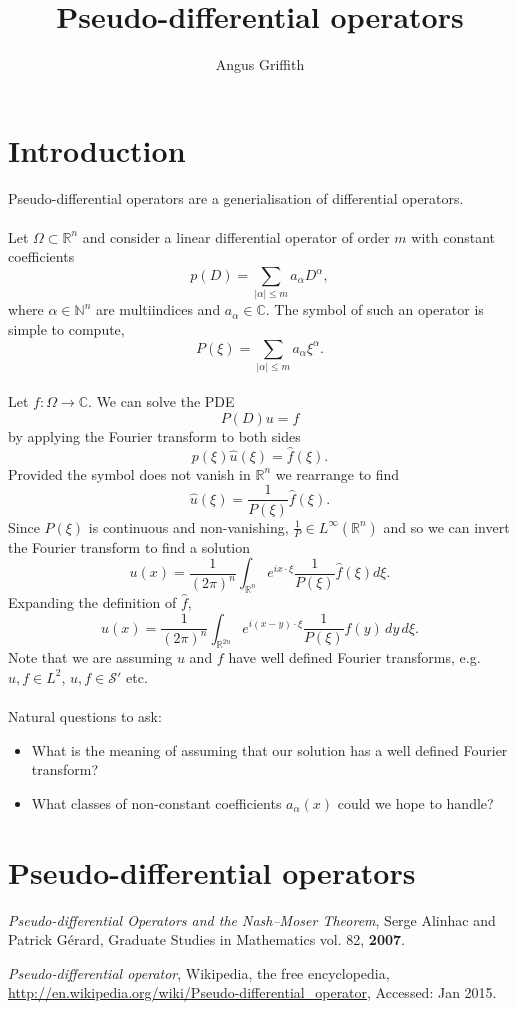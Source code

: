 \documentclass[10pt]{article}
\title{Pseudo-differential operators}
\author{Angus Griffith}
\newcommand{\R}{\mathbb{R}}
\newcommand{\C}{\mathbb{C}}
\newcommand{\N}{\mathbb{N}}
\begin{document}
\maketitle

\section{Introduction}
Pseudo-differential operators are a generialisation of differential operators.
\paragraph{}
Let $\Omega \subset \R^n$ and consider a linear differential operator of order $m$ with constant coefficients
\[
p(D) = \sum_{|\alpha| \le m} a_\alpha D^\alpha,
\]
where $\alpha \in \N^n$ are multiindices and $a_\alpha \in \C$.
The symbol of such an operator is simple to compute,
\[
P(\xi) = \sum_{|\alpha| \le m} a_\alpha \xi^\alpha.
\]
\paragraph{}
Let $f : \Omega \to \C$.
We can solve the PDE
\[
P(D) u = f
\]
by applying the Fourier transform to both sides
\[
p(\xi) \hat{u}(\xi) = \hat{f}(\xi).
\]
Provided the symbol does not vanish in $\R^n$ we rearrange to find
\[
\hat{u}(\xi) = \frac{1}{P(\xi)} \hat{f}(\xi).
\]
Since $P(\xi)$ is continuous and non-vanishing, $\frac{1}{P} \in L^\infty(\R^n)$ and so we can invert the Fourier transform to find a solution
\[
u(x) = \frac{1}{(2 \pi)^n} \int_{\R^n} e^{i x \cdot \xi} \frac{1}{P(\xi)} \hat{f}(\xi) d\xi.
\]
Expanding the definition of $\hat{f}$,
\[
u(x) = \frac{1}{(2 \pi)^n} \int_{\R^{2n}} e^{i (x-y) \cdot \xi} \frac{1}{P(\xi)} f(y) \, dy \, d\xi.
\]
Note that we are assuming $u$ and $f$ have well defined Fourier transforms, e.g. $u,f \in L^2$, $u,f \in \mathcal{S}'$ etc.
\paragraph{}
Natural questions to ask:
\begin{itemize}
\item What is the meaning of assuming that our solution has a well defined Fourier transform?
\item What classes of non-constant coefficients $a_\alpha(x)$ could we hope to handle?
\end{itemize}
\section{Pseudo-differential operators}


%
\begin{thebibliography}{9}
\emph{Pseudo-differential Operators and the Nash--Moser Theorem},
Serge Alinhac and Patrick G\'erard,
Graduate Studies in Mathematics vol. 82,
\textbf{2007}.

\emph{Pseudo-differential operator},
Wikipedia, the free encyclopedia,
\url{http://en.wikipedia.org/wiki/Pseudo-differential_operator},
Accessed: Jan 2015.
\end{thebibliography}
\end{document}
